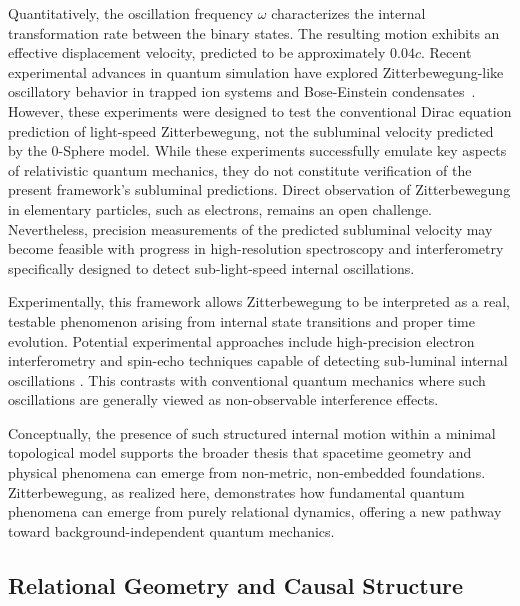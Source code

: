 \documentclass[%
 reprint,
 amsmath,amssymb,
 aps,
]{revtex4-1}
\numberwithin{equation}{section}%
\begin{document}
Quantitatively, the oscillation frequency $\omega$ characterizes the internal transformation rate between the binary states. The resulting motion exhibits an effective displacement velocity, predicted to be approximately $0.04c$\cite{hanamura2309.0047}. Recent experimental advances in quantum simulation have explored Zitterbewegung-like oscillatory behavior in trapped ion systems\cite{gerritsma2010} and Bose-Einstein condensates~\cite{leblanc2013}. However, these experiments were designed to test the conventional Dirac equation prediction of light-speed Zitterbewegung, not the subluminal velocity predicted by the 0-Sphere model. While these experiments successfully emulate key aspects of relativistic quantum mechanics, they do not constitute verification of the present framework's subluminal predictions. Direct observation of Zitterbewegung in elementary particles, such as electrons, remains an open challenge. Nevertheless, precision measurements of the predicted subluminal velocity may become feasible with progress in high-resolution spectroscopy and interferometry specifically designed to detect sub-light-speed internal oscillations.

Experimentally, this framework allows Zitterbewegung to be interpreted as a real, testable phenomenon arising from internal state transitions and proper time evolution. Potential experimental approaches include high-precision electron interferometry and spin-echo techniques capable of detecting sub-luminal internal oscillations \cite{gerritsma2010, leblanc2013}. This contrasts with conventional quantum mechanics where such oscillations are generally viewed as non-observable interference effects.

Conceptually, the presence of such structured internal motion within a minimal topological model supports the broader thesis that spacetime geometry and physical phenomena can emerge from non-metric, non-embedded foundations. Zitterbewegung, as realized here, demonstrates how fundamental quantum phenomena can emerge from purely relational dynamics, offering a new pathway toward background-independent quantum mechanics.

\subsection{Relational Geometry and Causal Structure}
\label{subsec:relational_geometry}
\end{document}
